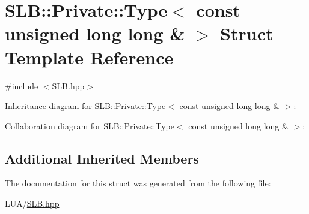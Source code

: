 \hypertarget{structSLB_1_1Private_1_1Type_3_01const_01unsigned_01long_01long_01_6_01_4}{}\section{S\+LB\+:\+:Private\+:\+:Type$<$ const unsigned long long \& $>$ Struct Template Reference}
\label{structSLB_1_1Private_1_1Type_3_01const_01unsigned_01long_01long_01_6_01_4}


{\ttfamily \#include $<$S\+L\+B.\+hpp$>$}



Inheritance diagram for S\+LB\+:\+:Private\+:\+:Type$<$ const unsigned long long \& $>$\+:


Collaboration diagram for S\+LB\+:\+:Private\+:\+:Type$<$ const unsigned long long \& $>$\+:
\subsection*{Additional Inherited Members}


The documentation for this struct was generated from the following file\+:\begin{DoxyCompactItemize}
\item 
L\+U\+A/\hyperlink{SLB_8hpp}{S\+L\+B.\+hpp}\end{DoxyCompactItemize}
